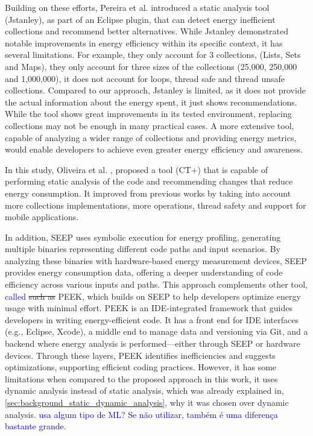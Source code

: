 \documentclass[sigplan]{acmart}
\newcommand{\wnote}[1]{\textcolor{blue}{#1}}
\begin{document}
Building on these efforts, Pereira et al. \cite{10.1145/3238147.3240473} introduced a static analysis tool (Jstanley), as part of an Eclipse plugin, that can detect energy inefficient collections and recommend better alternatives. While Jstanley demonstrated notable improvements in energy efficiency within its specific context, it has several limitations.
For example, they only account for 3 collections, (Lists, Sets and Maps), they only account for three sizes of the collections (25,000, 250,000 and 1,000,000), it does not account for loops, thread safe and thread unsafe collections. Compared to our approach, Jstanley is limited, as it does not provide the actual information about the energy spent, it just shows recommendations. While the tool shows great improvements in its tested environment, replacing collections may not be enough in many practical cases. A more extensive tool, capable of analyzing a wider range of collections and providing energy metrics, would enable developers to achieve even greater energy efficiency and awareness.

In this study, Oliveira et al. \cite{8816747}, proposed a tool (CT+) that is capable of performing static analysis of the code and recommending changes that reduce energy consumption. It improved from previous works by taking into account more collections implementations, more operations, thread safety and support for mobile applications. 

In addition, SEEP \cite{10.1145/2094091.2094106} uses symbolic execution for energy profiling, generating multiple binaries representing different code paths and input scenarios. By analyzing these binaries with hardware-based energy measurement devices, SEEP provides energy consumption data, offering a deeper understanding of code efficiency across various inputs and paths. This approach complements other tool, \wnote{called} \st{such as} PEEK\cite{187026}, which builds on SEEP to help developers optimize energy usage with minimal effort. PEEK is an IDE-integrated framework that guides developers in writing energy-efficient code. It has a front end for IDE interfaces (e.g., Eclipse, Xcode), a middle end to manage data and versioning via Git, and a backend where energy analysis is performed—either through SEEP or hardware devices. Through these layers, PEEK identifies inefficiencies and suggests optimizations, supporting efficient coding practices. However, it has some limitations when compared to the proposed approach in this work, it uses dynamic analysis instead of static analysis, which was already explained in, \ref{sec:background_static_dynamic_analysis}, why it was chosen over dynamic analysis. \wnote{usa algum tipo de ML? Se não utilizar, também é uma diferença bastante grande.}
\end{document}
